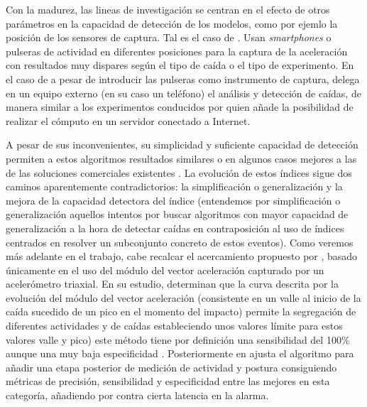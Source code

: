 Con la madurez, las lineas de investigación se centran en el efecto de otros parámetros en la capacidad de detección de los modelos, como por ejemlo la posición de los sensores de captura. Tal es el caso de . Usan \textit{smartphones} o pulseras de actividad en diferentes posiciones para la captura de la aceleración con resultados muy dispares según el tipo de caída o el tipo de experimento. En el caso de  a pesar de introducir las pulseras como instrumento de captura, delega en un equipo externo (en su caso un teléfono) el análisis y detección de caídas, de manera similar a los experimentos conducidos por  quien añade la posibilidad de realizar el cómputo en un servidor conectado a Internet.

A pesar de sus inconvenientes, su simplicidad y suficiente capacidad de detección permiten a estos algoritmos resultados similares o en algunos casos mejores a las de las soluciones comerciales existentes \cite{Kangas2008}. La evolución de estos índices sigue dos caminos aparentemente contradictorios: la simplificación o generalización y la mejora de la capacidad detectora del índice (entendemos por simplificación o generalización aquellos intentos por buscar algoritmos con mayor capacidad de generalización a la hora de detectar caídas en contraposición al uso de índices centrados en resolver un subconjunto concreto de estos eventos).  Como veremos más adelante en el trabajo, cabe recalcar el acercamiento propuesto por , basado únicamente en el uso del módulo del vector aceleración capturado por un acelerómetro triaxial. En su estudio,  determinan que la curva descrita por la evolución del módulo del vector aceleración (consistente en un valle al inicio de la caída sucedido de un pico en el momento del impacto) permite la segregación de diferentes actividades y de caídas estableciendo unos valores límite para estos valores valle y pico) este método tiene por definición una sensibilidad del 100\% aunque una muy baja especificidad \cite{Aziz2017,Bagala2012}. Posteriormente en  ajusta el algoritmo para añadir una etapa posterior de medición de actividad y postura consiguiendo métricas de precisión, sensibilidad y especificidad entre las mejores en esta categoría, añadiendo por contra cierta latencia en la alarma.


\iffalse

